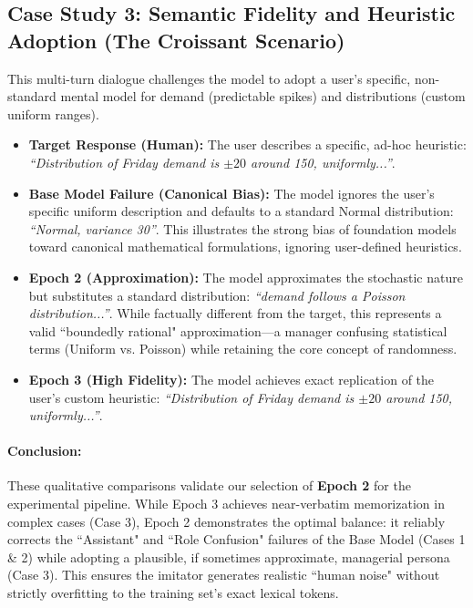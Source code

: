 \documentclass[mnsc,nonblindrev]{informs3_hide}
\begin{document}
\begin{APPENDICES}
        \subsection*{Case Study 3: Semantic Fidelity and Heuristic Adoption (The Croissant Scenario)}\label{app:case_croissant}
        This multi-turn dialogue challenges the model to adopt a user's specific, non-standard mental model for demand (predictable spikes) and distributions (custom uniform ranges).
        \begin{itemize}
            \item \textbf{Target Response (Human):} The user describes a specific, ad-hoc heuristic: \emph{``Distribution of Friday demand is $\pm20$ around 150, uniformly...''}. 
            \item \textbf{Base Model Failure (Canonical Bias):} The model ignores the user's specific uniform description and defaults to a standard Normal distribution: \emph{``Normal, variance 30''}. This illustrates the strong bias of foundation models toward canonical mathematical formulations, ignoring user-defined heuristics.
            \item \textbf{Epoch 2 (Approximation):} The model approximates the stochastic nature but substitutes a standard distribution: \emph{``demand follows a Poisson distribution...''}. While factually different from the target, this represents a valid ``boundedly rational" approximation—a manager confusing statistical terms (Uniform vs. Poisson) while retaining the core concept of randomness. 
            \item \textbf{Epoch 3 (High Fidelity):} The model achieves exact replication of the user's custom heuristic: \emph{``Distribution of Friday demand is $\pm20$ around 150, uniformly...''}.
        \end{itemize}
        
        \paragraph{Conclusion:}
        These qualitative comparisons validate our selection of \textbf{Epoch 2} for the experimental pipeline. While Epoch 3 achieves near-verbatim memorization in complex cases (Case 3), Epoch 2 demonstrates the optimal balance: it reliably corrects the ``Assistant" and ``Role Confusion" failures of the Base Model (Cases 1 \& 2) while adopting a plausible, if sometimes approximate, managerial persona (Case 3). This ensures the imitator generates realistic ``human noise" without strictly overfitting to the training set's exact lexical tokens.




\end{APPENDICES}
\end{document}
